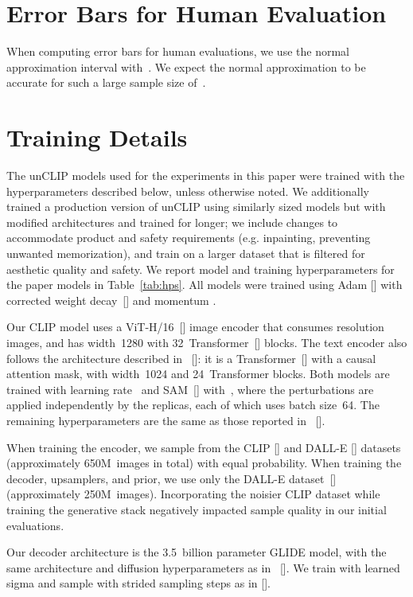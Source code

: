\documentclass{article}
\newcommand{\shortcite}[1]{[\citenum{#1}]}
\newcommand{\namecite}[1]{\citeauthor{#1} [\citenum{#1}]}
\begin{document}
\section{Error Bars for Human Evaluation}
\label{app:error_bars}

When computing error bars for human evaluations, we use the normal approximation interval with~. We expect the normal approximation to be accurate for such a large sample size of~.

\section{Training Details}
\label{app:hps}
The unCLIP models used for the experiments in this paper were trained with the hyperparameters described below, unless otherwise noted. We additionally trained a production version of unCLIP using similarly sized models but with modified architectures and trained for longer; we include changes to accommodate product and safety requirements (e.g. inpainting, preventing unwanted memorization), and train on a larger dataset that is filtered for aesthetic quality and safety. We report model and training hyperparameters for the paper models in Table~\ref{tab:hps}. All models were trained using Adam \shortcite{adam} with corrected weight decay~\shortcite{adamw} and momentum .

Our CLIP model uses a ViT-H/16~\shortcite{vit} image encoder that consumes  resolution images, and has width~1280 with 32~Transformer~\shortcite{transformer} blocks. The text encoder also follows the architecture described in~\namecite{clip}: it is a Transformer~\shortcite{transformer} with a causal attention mask, with width~1024 and 24~Transformer blocks. Both models are trained with learning rate~ and SAM~\shortcite{sam} with~, where the perturbations are applied independently by the replicas, each of which uses batch size~64. The remaining hyperparameters are the same as those reported in~\namecite{clip}.

When training the encoder, we sample from the CLIP \shortcite{clip} and DALL-E \shortcite{dalle} datasets (approximately 650M~images in total) with equal probability. When training the decoder, upsamplers, and prior, we use only the DALL-E dataset~\shortcite{dalle} (approximately 250M~images). Incorporating the noisier CLIP dataset while training the generative stack negatively impacted sample quality in our initial evaluations. 

Our decoder architecture is the 3.5~billion parameter GLIDE model, with the same architecture and diffusion hyperparameters as in~\namecite{glide}. We train with learned sigma and sample with  strided sampling steps as in \namecite{improved}. 
\end{document}
